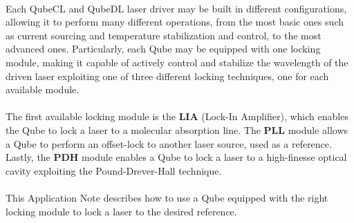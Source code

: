 \documentclass[a4paper,12pt,english]{article}
\begin{document}
		
	
	\newpage
    
    \paragraph{}Each QubeCL and QubeDL laser driver may be built in different configurations, allowing it to perform many different operations, from the most basic ones such as current sourcing and temperature stabilization and control, to the most advanced ones.
    \newline Particularly, each Qube may be equipped with one locking module, making it capable of actively control and stabilize the wavelength of the driven laser exploiting one of three different locking techniques, one for each available module.
    
    \paragraph{} The first available locking module is the \textbf{LIA} (Lock-In Amplifier), which enables the Qube to lock a laser to a molecular absorption line.
    \newline The \textbf{PLL} module allows a Qube to perform an offset-lock to another laser source, used as a reference.
    \newline Lastly, the \textbf{PDH} module enables a Qube to lock a laser to a high-finesse optical cavity exploiting the Pound-Drever-Hall technique.
    
    \paragraph{} This Application Note describes how to use a Qube equipped with the right locking module to lock a laser to the desired reference.
    
    \tableofcontents
	\listoffigures   
	\newpage

    
	
    \newpage

    
    \newpage

    \begin{versionhistory}
    \end{versionhistory}
\end{document}
